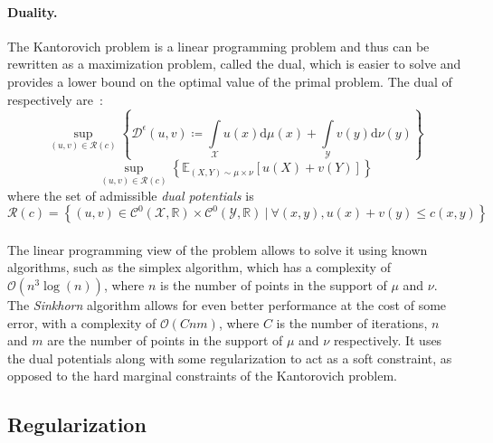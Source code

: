 \documentclass[a4paper,11pt]{article}
\newcommand{\R}{\mathbb{R}}
\newcommand{\E}{\mathbb{E}}
\newcommand{\1}{\mathbbm{1}}
\begin{document}
\paragraph{Duality.}The Kantorovich problem is a linear programming problem and thus can be rewritten as a maximization problem, called the dual, which is easier to solve and provides a lower bound on the optimal value of the primal problem. The dual of  respectively are~:
\begin{equation}
    \label{eq:kantorovich_dual}
    \sup_{(u, v) \in \mathcal{R}(c)} \left\{\mathcal{D}^{\epsilon}(u,v) \coloneq \int\limits_{\mathcal{X}} u(x) \mathrm{d}\mu(x) + \int\limits_{\mathcal{Y}} v(y) \mathrm{d}\nu(y)\right\}
\end{equation}
\begin{equation}
    \label{eq:kantorovich_dual_rewritten}
    \sup_{(u, v) \in \mathcal{R}(c)} \left\{\E_{(X, Y) \sim \mu\times\nu}[u(X) + v(Y)]\right\}
\end{equation}
where the set of admissible \emph{dual potentials} is
\begin{equation}
    \mathcal{R}(c) = \left\{(u, v) \in \mathcal{C}^{0}(\mathcal{X}, \R) \times \mathcal{C}^{0}(\mathcal{Y}, \R)~|~\forall (x, y), u(x) + v(y) \leq c(x, y)\right\}
\end{equation}

\paragraph{}The linear programming view of the problem allows to solve it using known algorithms, such as the simplex algorithm, which has a complexity of $\mathcal{O}(n^3\log(n))$, where $n$ is the number of points in the support of $\mu$ and $\nu$. The \emph{Sinkhorn} algorithm \citep{sinkhorn1967diagonal} allows for even better performance at the cost of some error, with a complexity of $\mathcal{O}(Cnm)$, where $C$ is the number of iterations, $n$ and $m$ are the number of points in the support of $\mu$ and $\nu$ respectively. It uses the dual potentials along with some regularization to act as a soft constraint, as opposed to the hard marginal constraints of the Kantorovich problem.

\subsection{Regularization}
\label{sec:regularization}
\end{document}
